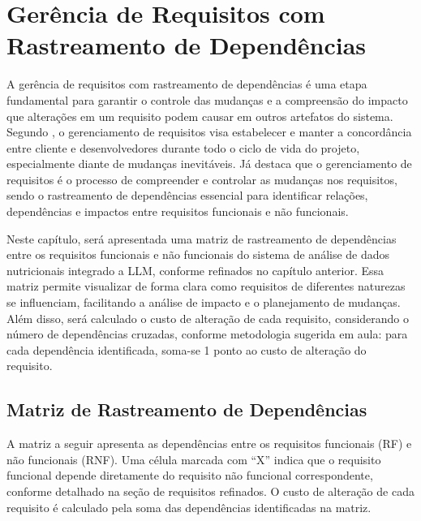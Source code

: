 \chapter{Gerência de Requisitos com Rastreamento de Dependências}\label{cap:7-ger-req-rast-dep}

A gerência de requisitos com rastreamento de dependências é uma etapa fundamental para garantir o controle das mudanças e a compreensão do impacto que alterações em um requisito podem causar em outros artefatos do sistema. Segundo \cite{oberg2000usecases}, o gerenciamento de requisitos visa estabelecer e manter a concordância entre cliente e desenvolvedores durante todo o ciclo de vida do projeto, especialmente diante de mudanças inevitáveis. Já \cite{sommerville2003engenharia} destaca que o gerenciamento de requisitos é o processo de compreender e controlar as mudanças nos requisitos, sendo o rastreamento de dependências essencial para identificar relações, dependências e impactos entre requisitos funcionais e não funcionais.

Neste capítulo, será apresentada uma matriz de rastreamento de dependências entre os requisitos funcionais e não funcionais do sistema de análise de dados nutricionais integrado a LLM, conforme refinados no capítulo anterior. Essa matriz permite visualizar de forma clara como requisitos de diferentes naturezas se influenciam, facilitando a análise de impacto e o planejamento de mudanças. Além disso, será calculado o custo de alteração de cada requisito, considerando o número de dependências cruzadas, conforme metodologia sugerida em aula: para cada dependência identificada, soma-se 1 ponto ao custo de alteração do requisito.

\section{Matriz de Rastreamento de Dependências}

A matriz a seguir apresenta as dependências entre os requisitos funcionais (RF) e não funcionais (RNF). Uma célula marcada com ``X'' indica que o requisito funcional depende diretamente do requisito não funcional correspondente, conforme detalhado na seção de requisitos refinados. O custo de alteração de cada requisito é calculado pela soma das dependências identificadas na matriz.

